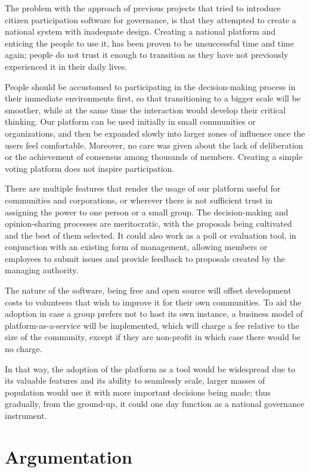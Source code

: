 \documentclass[a4paper,11pt]{article}
\begin{document}
\begin{multicols}{2}
The problem with the approach of previous projects that tried to introduce citizen participation software for governance, is that they attempted to create a national system with inadequate design. Creating a national platform and enticing the people to use it, has been proven to be unsuccessful time and time again; people do not trust it enough to transition as they have not previously experienced it in their daily lives.

People should be accustomed to participating in the decision-making process in their immediate environments first, so that transitioning to a bigger scale will be smoother, while at the same time the interaction would develop their critical thinking. Our platform can be used initially in small communities or organizations, and then be expanded slowly into larger zones of influence once the users feel comfortable. Moreover, no care was given about the lack of deliberation or the achievement of consensus among thousands of members. Creating a simple voting platform does not inspire participation.

There are multiple features that render the usage of our platform useful for communities and corporations, or wherever there is not sufficient trust in assigning the power to one person or a small group. The decision-making and opinion-sharing processes are meritocratic, with the proposals being cultivated and the best of them selected. It could also work as a poll or evaluation tool, in conjunction with an existing form of management, allowing members or employees to submit issues and provide feedback to proposals created by the managing authority.

The nature of the software, being free and open source will offset development costs to volunteers that wish to improve it for their own communities. To aid the adoption in case a group prefers not to host its own instance, a business model of platform-as-a-service will be implemented, which will charge a fee relative to the size of the community, except if they are non-profit in which case there would be no charge.

In that way, the adoption of the platform as a tool would be widespread due to its valuable features and its ability to seamlessly scale, larger masses of population would use it with more important decisions being made; thus gradually, from the ground-up, it could one day function as a national governance instrument.

\section{Argumentation} \label{argumentation}


\end{multicols}
\end{document}

